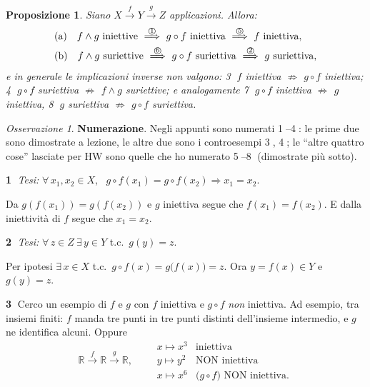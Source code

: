 \documentclass[11pt,a4paper]{article}
\newcommand{\R}{\mathbb{R}}
\theoremstyle{definition}
\theoremstyle{plain}
\newtheorem{proposizione}[definizione]{Proposizione}
\theoremstyle{remark}
\newtheorem*{osservazione}{Osservazione}
\begin{document}
\begin{proposizione}\label{prop:comp}
Siano $X\xrightarrow{f}Y\xrightarrow{g}Z$ applicazioni. Allora:
\begin{align*}
&\text{(a)}\quad f\wedge g\ \text{iniettive}\ \overset{\text{\textcircled{1}}}{\Longrightarrow}\ g\circ f\ \text{iniettiva}\ \overset{\text{\textcircled{5}}}{\Longrightarrow}\ f\ \text{iniettiva},\\
&\text{(b)}\quad f\wedge g\ \text{suriettive}\ \overset{\text{\textcircled{6}}}{\Longrightarrow}\ g\circ f\ \text{suriettiva}\ \overset{\text{\textcircled{2}}}{\Longrightarrow}\ g\ \text{suriettiva},
\end{align*}
e in generale le implicazioni inverse \emph{non} valgono: \textcircled{3} $f$ iniettiva $\not\Rightarrow$ $g\circ f$ iniettiva; \textcircled{4} $g\circ f$ suriettiva $\not\Rightarrow$ $f\wedge g$ suriettive; e analogamente \textcircled{7} $g\circ f$ iniettiva $\not\Rightarrow$ $g$ iniettiva, \textcircled{8} $g$ suriettiva $\not\Rightarrow$ $g\circ f$ suriettiva.
\end{proposizione}

\begin{osservazione}
\textbf{Numerazione}. 
Negli appunti sono numerati \textcircled{1}--\textcircled{4}: le prime due sono dimostrate a lezione, le altre due sono i controesempi \textcircled{3}, \textcircled{4}; le ``altre quattro cose'' lasciate per HW sono quelle che ho numerato \textcircled{5}--\textcircled{8} (dimostrate pi\`u sotto).
\end{osservazione}

\textbf{\textcircled{1}} \emph{Tesi:} $\forall\,x_1,x_2\in X$, \ $g\circ f(x_1)=g\circ f(x_2)\Rightarrow x_1=x_2$.

Da $g(f(x_1))=g(f(x_2))$ e $g$ iniettiva segue che $f(x_1)=f(x_2)$. E dalla iniettivit\`a di $f$ segue che $x_1=x_2$.

\textbf{\textcircled{2}} \emph{Tesi:} $\forall\,z\in Z\ \exists\,y\in Y$ t.c.\ $g(y)=z$.

Per ipotesi $\exists\,x\in X$ t.c.\ $g\circ f(x)=g\bigl(f(x)\bigr)=z$. Ora $y=f(x)\in Y$ e $g(y)=z$.

\textbf{\textcircled{3}} Cerco un esempio di $f$ e $g$ con $f$ iniettiva e $g\circ f$ \emph{non} iniettiva. Ad esempio, tra insiemi finiti: $f$ manda tre punti in tre punti distinti dell'insieme intermedio, e $g$ ne identifica alcuni. Oppure
\[
\R\xrightarrow{\ f\ }\R\xrightarrow{\ g\ }\R,\qquad
\begin{array}{ll}
x\mapsto x^3&\text{iniettiva}\\
y\mapsto y^2&\text{NON iniettiva}\\
x\mapsto x^6&\text{($g\circ f$) NON iniettiva.}
\end{array}
\]
\end{document}
